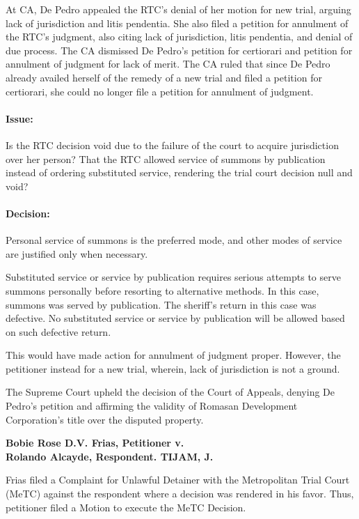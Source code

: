 \documentclass[
12pt,
oneside,
onehalfspacing,
headsepline
]{DigestCollection}
\begin{document}
At CA, De Pedro appealed the RTC's denial of her motion for new trial, arguing lack of jurisdiction and litis pendentia. She also filed a petition for annulment of the RTC's judgment, also citing lack of jurisdiction, litis pendentia, and denial of due process. The CA dismissed De Pedro's petition for certiorari and petition for annulment of judgment for lack of merit. The CA ruled that since De Pedro already availed herself of the remedy of a new trial and filed a petition for certiorari, she could no longer file a petition for annulment of judgment.

\paragraph{Issue:}

Is the RTC decision void due to the failure of the court to acquire jurisdiction over her person? That the RTC allowed service of summons by publication instead of ordering substituted service, rendering the trial court decision null and void?

\paragraph{Decision:}


Personal service of summons is the preferred mode, and other modes of service are justified only when necessary.

Substituted service or service by publication requires serious attempts to serve summons personally before resorting to alternative methods. In this case, summons was served by publication. The sheriff’s return in this case was defective. No substituted service or service by publication will be allowed based on such defective return.

This would have made action for annulment of judgment proper. However, the petitioner instead for a new trial, wherein, lack of jurisdiction is not a ground.

The Supreme Court upheld the decision of the Court of Appeals, denying De Pedro's petition and affirming the validity of Romasan Development Corporation's title over the disputed property.


\noindent\textbf{Bobie Rose D.V. Frias, Petitioner v. \\Rolando Alcayde, Respondent. TIJAM, J.}\vspace{0.4cm}

Frias filed a Complaint for Unlawful Detainer with the Metropolitan Trial Court (MeTC) against the respondent where a decision was rendered in his favor. Thus, petitioner filed a Motion to execute the MeTC Decision.
\end{document}
